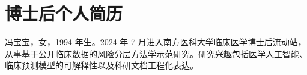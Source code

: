 \chapter*{博士后个人简历}

\noindent 冯宝宝，女，1994 年生。2024 年 7 月进入南方医科大学临床医学博士后流动站，从事基于公开临床数据的风险分层方法学示范研究。研究兴趣包括医学人工智能、临床预测模型的可解释性以及科研文档工程化表达。
